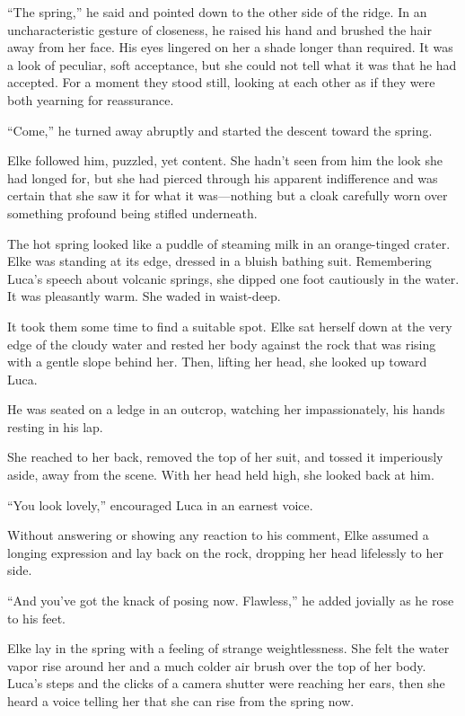 ``The spring,'' he said and pointed down to the other side of the ridge. In an uncharacteristic gesture of closeness, he raised his hand and brushed the hair away from her face. His eyes lingered on her a shade longer than required. It was a look of peculiar, soft acceptance, but she could not tell what it was that he had accepted. For a moment they stood still, looking at each other as if they were both yearning for reassurance.

``Come,'' he turned away abruptly and started the descent toward the spring.

Elke followed him, puzzled, yet content. She hadn't seen from him the look she had longed for, but she had pierced through his apparent indifference and was certain that she saw it for what it was---nothing but a cloak carefully worn over something profound being stifled underneath.

\sectionline

The hot spring looked like a puddle of steaming milk in an orange-tinged crater. Elke was standing at its edge, dressed in a bluish bathing suit. Remembering Luca's speech about volcanic springs, she dipped one foot cautiously in the water. It was pleasantly warm. She waded in waist-deep.

It took them some time to find a suitable spot. Elke sat herself down at the very edge of the cloudy water and rested her body against the rock that was rising with a gentle slope behind her. Then, lifting her head, she looked up toward Luca.

He was seated on a ledge in an outcrop, watching her impassionately, his hands resting in his lap.

She reached to her back, removed the top of her suit, and tossed it imperiously aside, away from the scene. With her head held high, she looked back at him.

``You look lovely,'' encouraged Luca in an earnest voice.

Without answering or showing any reaction to his comment, Elke assumed a longing expression and lay back on the rock, dropping her head lifelessly to her side.

``And you've got the knack of posing now. Flawless,'' he added jovially as he rose to his feet.

Elke lay in the spring with a feeling of strange weightlessness. She felt the water vapor rise around her and a much colder air brush over the top of her body. Luca's steps and the clicks of a camera shutter were reaching her ears, then she heard a voice telling her that she can rise from the spring now.

